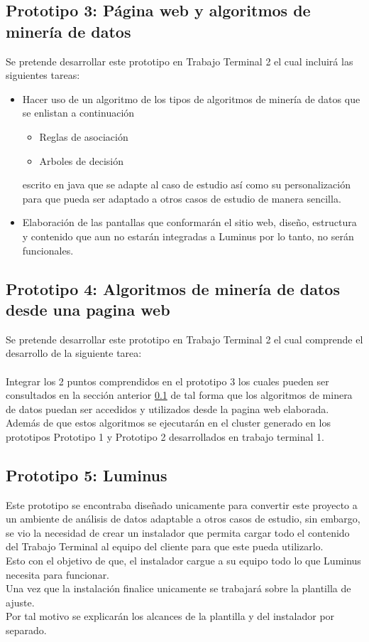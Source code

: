 \subsection{Prototipo 3: Página web y algoritmos de minería de datos}
\label{proto3}
Se pretende desarrollar este prototipo en Trabajo Terminal 2 el cual incluirá las siguientes tareas:
\begin{itemize}
	\item Hacer uso de un algoritmo de los tipos de algoritmos de minería de datos que se enlistan a continuación
	\begin{itemize}
		\item Reglas de asociación
		\item Arboles de decisión
	\end{itemize}
	 escrito en java que se adapte al caso de estudio así como su personalización para que pueda ser adaptado a otros casos de estudio de manera sencilla.
	\item Elaboración de las pantallas que conformarán el sitio web, diseño, estructura y contenido que aun no estarán integradas a Luminus por lo tanto, no serán funcionales.  
\end{itemize}
\subsection{Prototipo 4: Algoritmos de minería de datos desde una pagina web}
Se pretende desarrollar este prototipo en Trabajo Terminal 2 el cual comprende el desarrollo de la siguiente tarea:
\\ 
\\ 
Integrar los 2 puntos comprendidos en el prototipo 3 los cuales pueden ser consultados en la sección anterior \ref{proto3} de tal forma que los algoritmos de minera de datos puedan ser accedidos y utilizados desde la pagina web elaborada. 
\\
Además de que estos algoritmos se ejecutarán en el cluster generado en los prototipos Prototipo 1  y Prototipo 2  desarrollados en trabajo terminal 1.
\subsection{Prototipo 5: Luminus}
Este prototipo se encontraba diseñado unicamente para convertir este proyecto a un ambiente de análisis de datos adaptable a otros casos de estudio, sin embargo, se vio la necesidad de crear un instalador que permita cargar todo el contenido del Trabajo Terminal al equipo del cliente para que este pueda utilizarlo.\\
Esto con el objetivo de que, el instalador cargue a su equipo todo lo que Luminus necesita para funcionar.
\\
Una vez que la instalación finalice unicamente se trabajará sobre la plantilla de ajuste. \\
Por tal motivo se explicarán los alcances de la plantilla y del instalador por separado.
